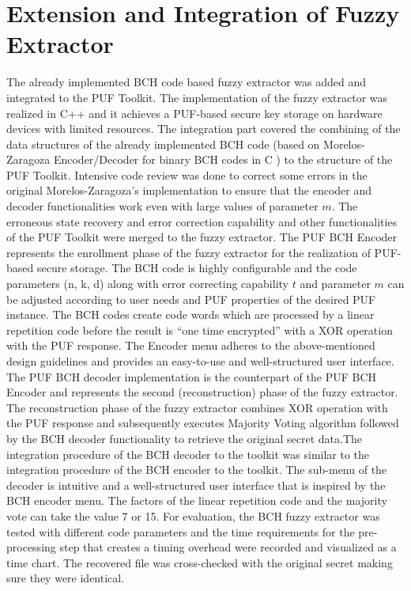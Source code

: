 \section{Extension and Integration of Fuzzy Extractor}
The already implemented BCH code based fuzzy extractor was added and integrated to the PUF Toolkit. The implementation of the fuzzy extractor was realized in C++ and it achieves a PUF-based secure key storage on hardware devices with limited resources. The integration part covered the combining of the data structures of the already implemented BCH code (based on Morelos-Zaragoza Encoder/Decoder for binary BCH codes in C \cite{69}) to the structure of the PUF Toolkit. Intensive code review was
done to correct some errors in the original Morelos-Zaragoza's implementation to ensure that the encoder and decoder functionalities work even with large values of parameter $m$. The erroneous state recovery and error correction capability and other functionalities of the PUF Toolkit were merged to the fuzzy extractor. The PUF BCH Encoder represents the enrollment phase of the fuzzy extractor for the realization of PUF-based secure storage. The BCH code is highly configurable and the code
parameters (n, k, d) along with error correcting capability $t$ and parameter $m$ can be adjusted according to user needs and PUF properties of the desired PUF instance. The BCH codes create code words which are processed by a linear repetition code before the result is ``one time encrypted'' with a XOR operation with the PUF response. The Encoder menu adheres to the above-mentioned design guidelines and provides an easy-to-use and well-structured user interface. The PUF BCH decoder
implementation is the counterpart of the PUF BCH Encoder and represents the second (reconstruction) phase of the fuzzy extractor. The reconstruction phase of the fuzzy extractor combines XOR operation with the PUF response and subsequently executes Majority Voting algorithm followed by the BCH decoder functionality to retrieve the original secret data.The integration procedure of the BCH decoder to the toolkit was similar to the integration procedure of the BCH encoder to the toolkit. The sub-menu of the
decoder is intuitive and a well-structured user interface that is inspired by the BCH encoder menu. The factors of the linear repetition code and the majority vote can take the value 7 or 15. For evaluation, the BCH fuzzy extractor was tested with different code parameters and the time requirements for the pre-processing step that creates a timing overhead were recorded and visualized as a time chart. The recovered file was cross-checked with the original secret making sure they were
identical.\\

